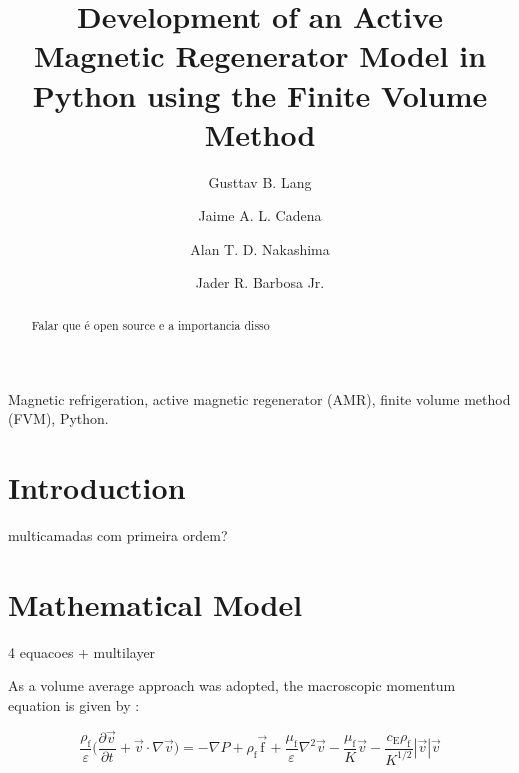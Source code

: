 \documentclass[review,preprint,12pt]{elsarticle}
\begin{document}
\begin{frontmatter}

\title{Development of an Active Magnetic Regenerator Model in Python using the Finite Volume Method}
\author{Gusttav B. Lang}
\author{Jaime A. L. Cadena}
\author{Alan T. D. Nakashima}
\author{Jader R. Barbosa Jr.}
\address{POLO Research Laboratories for Emerging Technologies in Cooling and Thermophysics, Department of Mechanical Engineering, Federal University of Santa Catarina (UFSC), Florian\'{o}polis, SC, 88040900, Brazil, Phone/Fax: (+ 55) 48 3721-7900}

\begin{abstract}

Falar que é open source e a importancia disso

\end{abstract}

\end{frontmatter}

\vspace{0.5cm}

 Magnetic refrigeration, active magnetic regenerator (AMR), finite volume method (FVM), Python.

\printnomenclature[1.4cm]

\pagebreak

\section{Introduction}

multicamadas com primeira ordem?


\section{Mathematical Model}

4 equacoes + multilayer


As a volume average approach was adopted, the macroscopic momentum equation is given by \cite{Kaviany1995,Nield2006}:

\begin{equation}
\frac{\rho_\textrm{f}}{\varepsilon}\Biggl(\frac{\partial\vec{v}}{\partial t} + \vec{v}\cdot\nabla\vec{v}\Biggr) = -\nabla P + \rho_\textrm{f}\vec{\textrm{f}} + \frac{\mu_\textrm{f}}{\varepsilon}\nabla^2\vec{v} - \frac{\mu_\textrm{f}}{K}\vec{v} -
\frac{c_\textrm{E}\rho_\textrm{f}}{K^{1/2}}|\vec{v}|\vec{v}
\label{BrinkFroch}
\end{equation}
\end{document}
